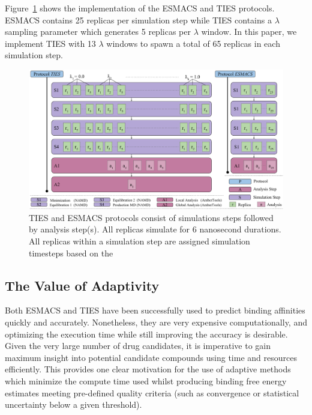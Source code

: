 
Figure~\ref{fig:ties_esmacs_application} shows the implementation of the
ESMACS and TIES protocols. ESMACS contains 25 replicas per simulation step
while TIES contains a $\lambda$ sampling parameter which generates 5 replicas
per $\lambda$ window. In this paper, we implement TIES with 13 $\lambda$
windows to spawn a total of 65 replicas in each simulation step.

\begin{figure}
  \centering
  \includegraphics[width=\columnwidth]{figures/ties_esmacs_application_model.pdf}
  \caption{TIES and ESMACS protocols consist of simulations steps followed
  by analysis step(s). All replicas simulate for 6 nanosecond durations. 
  All replicas within a simulation step are assigned simulation timesteps 
  based on the }
\label{fig:ties_esmacs_application}
\end{figure}


\subsection{The Value of Adaptivity}\label{ssec:adapt_ties}

Both ESMACS and TIES have been successfully used to predict binding affinities
quickly and accurately. Nonetheless, they are very expensive computationally,
and optimizing the execution time while still improving the accuracy is
desirable. Given the very large number of drug candidates, it is imperative to
gain maximum insight into potential candidate compounds using time and
resources efficiently. This provides one clear motivation for the use of
adaptive methods which minimize the compute time used whilst producing binding
free energy estimates meeting pre-defined quality criteria (such as
convergence or statistical uncertainty below a given threshold).
  
